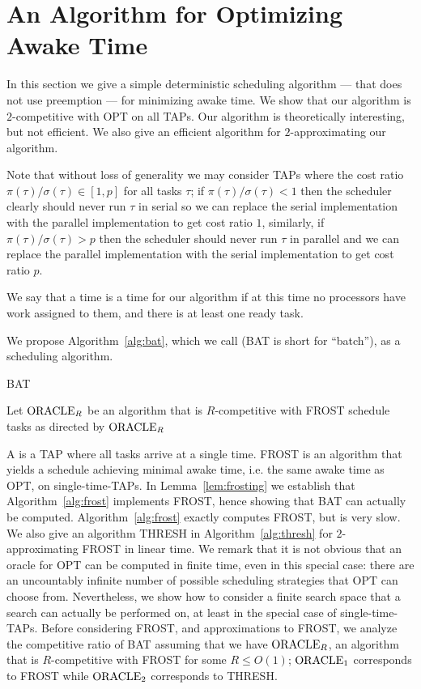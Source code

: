 \section{An Algorithm for Optimizing Awake Time} 
\label{sec:awaketime}
In this section we give a simple deterministic scheduling
algorithm --- that does not use preemption --- for minimizing
awake time. We show that our algorithm is $2$-competitive
with OPT on all TAPs. Our algorithm is theoretically interesting,
but not efficient. We also give an efficient algorithm for
$2$-approximating our algorithm.

Note that without loss of generality we may consider TAPs where
the cost ratio $\pi(\tau)/\sigma(\tau) \in [1,p]$ for all tasks
$\tau$; if $\pi(\tau)/\sigma(\tau) < 1$ then the scheduler
clearly should never run $\tau$ in serial so we can replace the
serial implementation with the parallel implementation to get
cost ratio $1$, similarly, if $\pi(\tau)/\sigma(\tau) > p$ then
the scheduler should never run $\tau$ in parallel and we can
replace the parallel implementation with the serial
implementation to get cost ratio $p$.

We say that a time is a  time for our algorithm if at
this time no processors have work assigned to them, and there is at
least one ready task.

We propose Algorithm~\ref{alg:bat}, which we call 
(BAT is short for \enquote{batch}), as a scheduling algorithm.

\begin{algorithm}
  \caption{BAT}
  \label{alg:bat}
  \begin{algorithmic}
    \State Let $\operatorname{\text{ORACLE}}_R$ be an algorithm that is $R$-competitive with FROST 
        \State schedule tasks as directed by $\operatorname{\text{ORACLE}}_R$
      \EndIf
    \EndWhile
  \end{algorithmic}
\end{algorithm}

A  is a TAP where all tasks arrive at a
single time. FROST is an algorithm that yields a schedule
achieving minimal awake time, i.e. the same awake time as OPT, on
single-time-TAPs. In Lemma~\ref{lem:frosting} we establish that
Algorithm~\ref{alg:frost} implements FROST, hence showing
that BAT can actually be computed. Algorithm~\ref{alg:frost}
exactly computes FROST, but is very slow. We also give an
algorithm THRESH in Algorithm~\ref{alg:thresh} for
$2$-approximating FROST in linear time. We remark that it is not
obvious that an oracle for OPT can be computed in finite time,
even in this special case: there are an uncountably infinite
number of possible scheduling strategies that OPT can choose
from. Nevertheless, we show how to consider a finite search space
that a search can actually be performed on, at least in the
special case of single-time-TAPs. Before considering FROST, and
approximations to FROST, we analyze the competitive ratio of BAT
assuming that we have $\operatorname{\text{ORACLE}}_R$, an algorithm that is
$R$-competitive with FROST for some $R \le O(1)$; $\operatorname{\text{ORACLE}}_1$
corresponds to FROST while $\operatorname{\text{ORACLE}}_2$ corresponds to THRESH.

